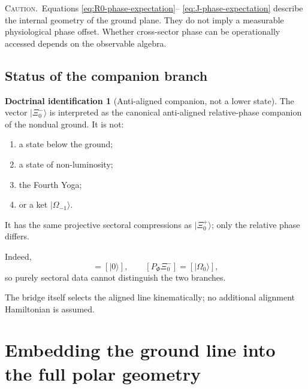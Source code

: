 \documentclass[11pt,reqno]{scrartcl}
\newcommand{\PP}{P_{\Psi}}
\newcommand{\PF}{P_{\Phi}}
\newcommand{\ket}[1]{\lvert #1\rangle}
\newcommand{\warninglabel}{\par\smallskip\noindent\textsc{Caution.}\ }
\theoremstyle{plain}
\theoremstyle{definition}
\newtheorem{identification}[identification]{Doctrinal identification}
\theoremstyle{remark}
\begin{document}
\warninglabel Equations \eqref{eq:R0-phase-expectation}--
\eqref{eq:J-phase-expectation} describe the internal geometry of the ground
plane.  They do not imply a measurable physiological phase offset.  Whether
cross-sector phase can be operationally accessed depends on the observable
algebra.

\subsection{Status of the companion branch}

\begin{identification}[Anti-aligned companion, not a lower state]
\label{id:companion-branch-status}
The vector \(\ket{\Xi_0^-}\) is interpreted as the canonical
anti-aligned relative-phase companion of the nondual ground.  It is not:
\begin{enumerate}[label=(\roman*)]
  \item a state below the ground;
  \item a state of non-luminosity;
  \item the Fourth Yoga;
  \item or a ket \(\ket{\Omega_{-1}}\).
\end{enumerate}
It has the same projective sectoral compressions as \(\ket{\Xi_0^+}\); only
the relative phase differs.
\end{identification}

Indeed,
\begin{equation}
  [\PP\Xi_0^-]=[\ket0],
  \qquad
  [\PF\Xi_0^-]=[\ket{\Omega_0}],
  \label{eq:companion-same-sector-rays}
\end{equation}
so purely sectoral data cannot distinguish the two branches.

The bridge itself selects the aligned line kinematically; no additional
alignment Hamiltonian is assumed.
\section{Embedding the ground line into the full polar geometry}
\label{sec:ground-full-polar}
\end{document}

